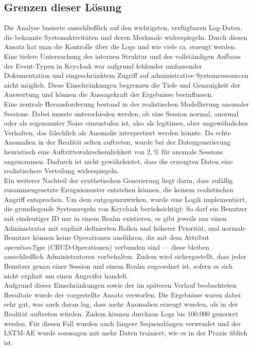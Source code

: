 \documentclass[a4paper,12pt]{article}
\begin{document}
	\subsection{Grenzen dieser Lösung}
	Die Analyse basierte ausschließlich auf den wichtigsten, verfügbaren Log-Daten, die bekannte Systemaktivitäten und deren Merkmale widerspiegeln. Durch diesen Ansatz hat man die Kontrolle über die Logs und wie viele ca. erzeugt werden. Eine tiefere Untersuchung der internen Struktur und des vollständigen Aufbaus der Event-Typen in Keycloak war aufgrund fehlender umfassender Dokumentation und eingeschränktem Zugriff auf administrative Systemressourcen nicht möglich. Diese Einschränkungen begrenzen die Tiefe und Genauigkeit der Auswertung und können die Aussagekraft der Ergebnisse beeinflussen.
	\\[0.5em]
	Eine zentrale Herausforderung bestand in der realistischen Modellierung anomaler Sessions. Dabei musste unterschieden werden, ob eine Session normal, anormal oder als sogenannter Noise einzustufen ist, also als legitimes, aber ungewöhnliches Verhalten, das fälschlich als Anomalie interpretiert werden könnte. Da echte Anomalien in der Realität selten auftreten, wurde bei der Datengenerierung heuristisch eine Auftrittswahrscheinlichkeit von 2,\,\% für anomale Sessions angenommen. Dadurch ist nicht gewährleistet, dass die erzeugten Daten eine realistischere Verteilung widerspiegeln.
	\\[0.5em]
	Ein weiterer Nachteil der synthetischen Generierung liegt darin, dass zufällig zusammengesetzte Ereignismuster entstehen können, die keinem realistischen Angriff entsprechen. Um dem entgegenzuwirken, wurde eine Logik implementiert, die grundlegende Systemregeln von Keycloak berücksichtigt: So darf ein Benutzer mit eindeutiger ID nur in einem Realm existieren, es gibt jeweils nur einen Administrator mit explizit definierten Rollen und höherer Priorität, und normale Benutzer können keine Operationen ausführen, die mit dem Attribut \textit{operationType} (CRUD-Operationen) verbunden sind — diese bleiben ausschließlich Administratoren vorbehalten. Zudem wird sichergestellt, dass jeder Benutzer genau einer Session und einem Realm zugeordnet ist, sofern es sich nicht explizit um einen Angreifer handelt.
	\\[0.5em]
	Aufgrund dieser Einschränkungen sowie der im späteren Verlauf beobachteten Resultate wurde der vorgestellte Ansatz verworfen. Die Ergebnisse waren dabei sehr gut, was auch daran lag, dass mehr Anomalien erzeugt wurden, als in der Realität auftreten würden. Zudem können durchaus Logs bis 100.000 generiert werden. Für diesen Fall wurden auch längere Sequenzlängen verwendet und der LSTM-AE wurde sozusagen mit mehr Daten trainiert, wie es in der Praxis üblich ist.
	
\end{document}
